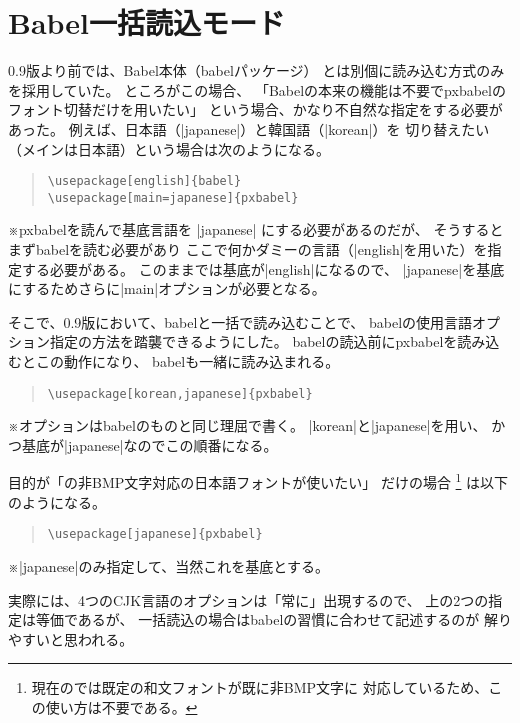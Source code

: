 \documentclass[uplatex,dvipdfmx,a4paper]{jsarticle}
\newcommand{\Pkg}[1]{\textsf{#1}}
\newcommand{\Note}{\par\noindent ※}
\begin{document}
\section{Babel一括読込モード}
\label{sec:Lumped-Loading}

0.9版より前では、Babel本体（\Pkg{babel}パッケージ）
とは別個に読み込む方式のみを採用していた。
ところがこの場合、
「Babelの本来の機能は不要で\Pkg{pxbabel}の
フォント切替だけを用いたい」
という場合、かなり不自然な指定をする必要があった。
例えば、日本語（|japanese|）と韓国語（|korean|）を
切り替えたい（メインは日本語）という場合は次のようになる。

\begin{quote}\begin{verbatim}
\usepackage[english]{babel}
\usepackage[main=japanese]{pxbabel}
\end{verbatim}\end{quote}
\Note \Pkg{pxbabel}を読んで基底言語を |japanese|
にする必要があるのだが、
そうするとまず\Pkg{babel}を読む必要があり
ここで何かダミーの言語（|english|を用いた）を指定する必要がある。
このままでは基底が|english|になるので、
|japanese|を基底にするためさらに|main|オプションが必要となる。

そこで、0.9版において、\Pkg{babel}と一括で読み込むことで、
\Pkg{babel}の使用言語オプション指定の方法を踏襲できるようにした。
\Pkg{babel}の読込前に\Pkg{pxbabel}を読み込むとこの動作になり、
\Pkg{babel}も一緒に読み込まれる。

\begin{quote}\begin{verbatim}
\usepackage[korean,japanese]{pxbabel}
\end{verbatim}\end{quote}
\Note オプションは\Pkg{babel}のものと同じ理屈で書く。
|korean|と|japanese|を用い、
かつ基底が|japanese|なのでこの順番になる。

目的が「{\upTeX}の非BMP文字対応の日本語フォントが使いたい」
だけの場合
\footnote{現在の{\upLaTeX}では既定の和文フォントが既に非BMP文字に
対応しているため、この使い方は不要である。}%
は以下のようになる。

\begin{quote}\begin{verbatim}
\usepackage[japanese]{pxbabel}
\end{verbatim}\end{quote}
\Note |japanese|のみ指定して、当然これを基底とする。

実際には、4つのCJK言語のオプションは「常に」出現するので、
上の2つの指定は等価であるが、
一括読込の場合は\Pkg{babel}の習慣に合わせて記述するのが
解りやすいと思われる。
\end{document}
